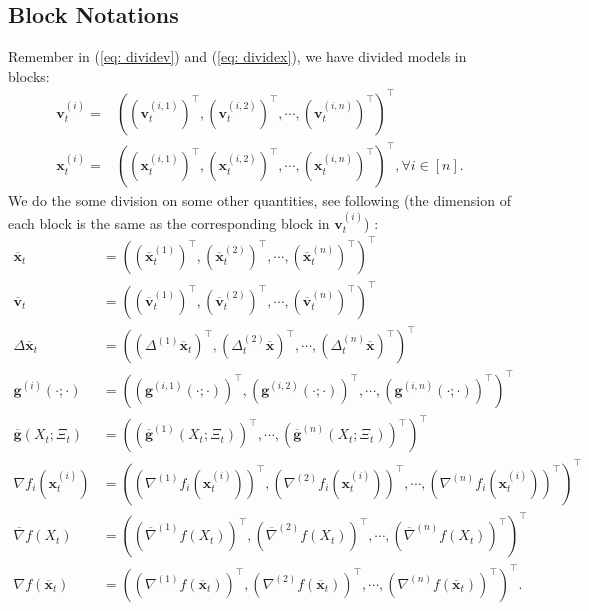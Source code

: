 \subsection{Block Notations}
Remember in (\ref{eq: dividev}) and (\ref{eq: dividex}), we have divided models in blocks:
\begin{align*}
\bm{v}_t^{(i)} = &\left(\left(\bm{v}_t^{(i,1)}\right)^{\top}, \left(\bm{v}_t^{(i,2)}\right)^{\top}, \cdots, \left(\bm{v}_t^{(i,n)}\right)^{\top}\right)^{\top}\\
\bm{x}_{t}^{(i)} = &\left(\left(\bm{x}_{t}^{(i,1)}\right)^{\top}, \left(\bm{x}_{t}^{(i,2)}\right)^{\top},\cdots, \left(\bm{x}_{t}^{(i,n)}\right)^{\top}\right)^{\top}, \forall i\in[n].
\end{align*}
 We do the some division on some other quantities, see following (the dimension of each block is the same as the corresponding block in $\bm{v}_t^{(i)}$) : 
\begin{align*}
	\overline{\bm{x}}_t &= \left(\left(\overline{\bm{x}}_t^{(1)}\right)^{\top},\left(\overline{\bm{x}}_t^{(2)}\right)^{\top},\cdots, \left(\overline{\bm{x}}_t^{(n)}\right)^{\top}\right)^{\top}\\
	\overline{\bm{v}}_t &= \left(\left(\overline{\bm{v}}_t^{(1)}\right)^{\top},\left(\overline{\bm{v}}_t^{(2)}\right)^{\top},\cdots, \left(\overline{\bm{v}}_t^{(n)}\right)^{\top}\right)^{\top}\\
	\Delta \overline{\bm{x}}_t &= \left(\left(\Delta^{(1)} \overline{\bm{x}}_t\right)^{\top}, \left(\Delta_t^{(2)} \overline{\bm{x}}\right)^{\top}, \cdots, \left(\Delta_t^{(n)} \overline{\bm{x}}\right)^{\top}\right)^{\top}\\
	\bm{g}^{(i)}(\cdot; \cdot) &= \left(\left(\bm{g}^{(i,1)}(\cdot; \cdot)\right)^{\top}, \left(\bm{g}^{(i,2)}(\cdot; \cdot)\right)^{\top}, \cdots, \left(\bm{g}^{(i,n)}(\cdot; \cdot)\right)^{\top}\right)^{\top}\\
	\overline{\bm{g}}(X_t;\Xi_t) &= \left(\left(\overline{\bm{g}}^{(1)}(X_t;\Xi_t)\right)^{\top},\cdots, \left(\overline{\bm{g}}^{(n)}(X_t;\Xi_t)\right)^{\top}\right)^{\top}\\
	\nabla f_i(\bm{x}_t^{(i)}) &= \left(\left(\nabla^{(1)} f_i(\bm{x}_t^{(i)})\right)^{\top}, \left(\nabla^{(2)} f_i(\bm{x}_t^{(i)})\right)^{\top}, \cdots, \left(\nabla^{(n)} f_i(\bm{x}_t^{(i)})\right)^{\top}\right)^{\top}\\
	\overline{\nabla} f(X_t) &= \left(\left(\overline{\nabla}^{(1)} f(X_t)\right)^{\top}, \left(\overline{\nabla}^{(2)} f(X_t)\right)^{\top}, \cdots, \left(\overline{\nabla}^{(n)} f(X_t)\right)^{\top}\right)^{\top}\\
	\nabla f(\overline{\bm{x}}_t)&= \left(\left(\nabla^{(1)} f(\overline{\bm{x}}_t)\right)^{\top}, \left(\nabla^{(2)} f(\overline{\bm{x}}_t)\right)^{\top}, \cdots, \left(\nabla^{(n)} f(\overline{\bm{x}}_t)\right)^{\top}\right)^{\top}.
\end{align*}


